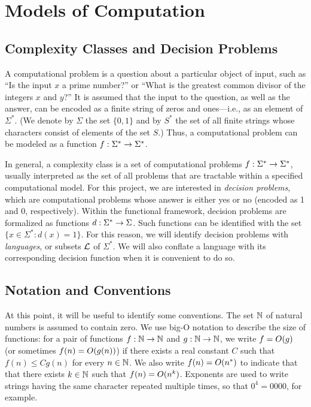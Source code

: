 \section{Models of Computation}

\subsection{Complexity Classes and Decision Problems}

A computational problem is a question about a particular object of input, such
as ``Is the input $x$ a prime number?'' or ``What is the greatest common divisor
of the integers $x$ and $y$?'' It is assumed that the input to the question, as
well as the answer, can be encoded as a finite string of zeros and ones---i.e.,
as an element of $\Sigma^*$. (We denote by $\Sigma$ the set $\{0,1\}$ and by
$S^*$ the set of all finite strings whose characters consist of elements of the
set $S$.) Thus, a computational problem can be modeled as a function
$f:\Sigma^*\rightarrow\Sigma^*$.

In general, a complexity class is a set of computational problems
$f:\Sigma^*\rightarrow\Sigma^*$, usually interpreted as the set of all problems that are
tractable within a specified computational model. For this project, we are
interested in \textit{decision problems}, which are computational problems whose
answer is either yes or no (encoded as 1 and 0, respectively). Within the
functional framework, decision problems are formalized as functions
$d:\Sigma^*\rightarrow\Sigma$. Such functions can be identified with the set
$\{x\in\Sigma^*:d(x)=1\}$. For this reason, we will identify decision problems
with \textit{languages}, or subsets $\mathcal{L}$ of $\Sigma^*$. We will also conflate 
a language with its corresponding decision function when it is convenient to do
so.

\subsection{Notation and Conventions}

At this point, it will be useful to identify some conventions. The set $\mathbb{N}$ of
natural numbers is assumed to contain zero. We use big-O notation to describe
the size of functions: for a pair of functions $f:\mathbb{N}\rightarrow\mathbb{N}$ and $g:\mathbb{N}\rightarrow\mathbb{N}$, we
write $f=O(g)$ (or sometimes $f(n)=O(g(n))$) if there exists a real constant
$C$ such that $f(n)\leq Cg(n)$ for every $n\in\mathbb{N}$. We also write $f(n)=O(n^*)$
to indicate that that there exists $k\in\mathbb{N}$ such that $f(n)=O(n^k)$. Exponents
are used to write strings having the same character repeated multiple times, so
that $0^4=0000$, for example.


